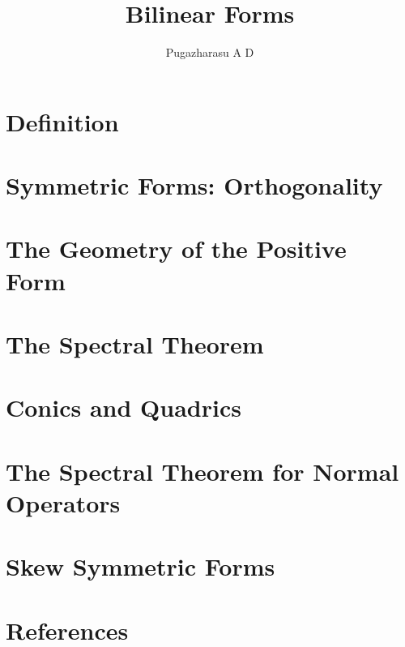 \documentclass[]{article}
\title{Bilinear Forms}
\author{Pugazharasu A D}
\begin{document}
\maketitle

\begin{abstract}

\end{abstract}
\section{Definition}
\section{Symmetric Forms: Orthogonality}
\section{The Geometry of the Positive Form}
\section{The Spectral Theorem}
\section{Conics and Quadrics}
\section{The Spectral Theorem for Normal Operators}
\section{Skew Symmetric Forms}

\section*{References}
\end{document}
